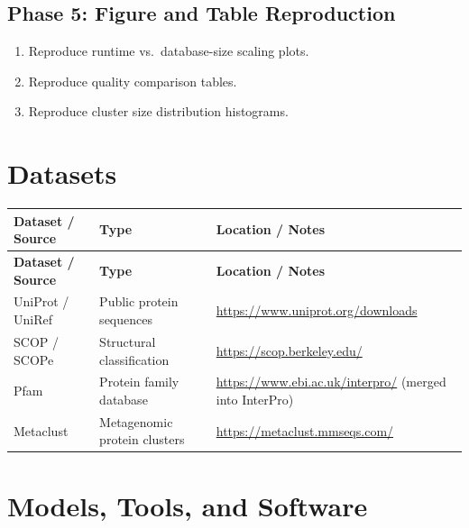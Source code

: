 \documentclass[11pt,a4paper]{article}
\begin{document}
\subsection{Phase 5: Figure and Table Reproduction}
\begin{enumerate}[label=\textbf{5.\arabic*}]
  \item Reproduce runtime vs.\ database-size scaling plots.
  \item Reproduce quality comparison tables.
  \item Reproduce cluster size distribution histograms.
\end{enumerate}

\section{Datasets}

\begin{longtable}{p{4.5cm} p{3.5cm} p{6cm}}
\toprule
\textbf{Dataset / Source} & \textbf{Type} & \textbf{Location / Notes} \\
\midrule
\endfirsthead
\toprule
\textbf{Dataset / Source} & \textbf{Type} & \textbf{Location / Notes} \\
\midrule
\endhead
UniProt / UniRef & Public protein sequences & \url{https://www.uniprot.org/downloads} \\
\midrule
SCOP / SCOPe & Structural classification & \url{https://scop.berkeley.edu/} \\
\midrule
Pfam & Protein family database & \url{https://www.ebi.ac.uk/interpro/} (merged into InterPro) \\
\midrule
Metaclust & Metagenomic protein clusters & \url{https://metaclust.mmseqs.com/} \\
\bottomrule
\end{longtable}

\section{Models, Tools, and Software}
\end{document}
